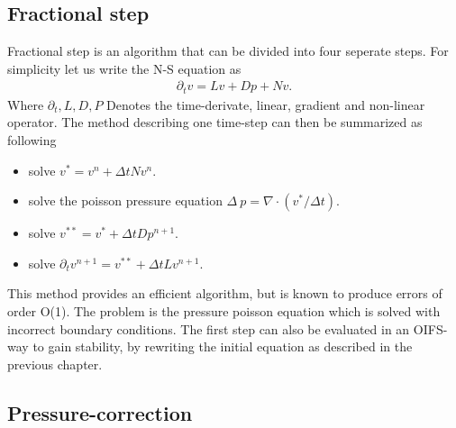 \subsection{Fractional step}
Fractional step is an algorithm that can be divided into four seperate steps. For simplicity let us write the N-S
equation as 
\begin{align}
    \partial_t v = Lv + Dp + Nv.
    \label{eq:NSfracstep}
\end{align}
Where $\partial_t, L,D,P$ Denotes the time-derivate, linear, gradient and non-linear operator. 
The method describing one time-step can then be summarized as following
\begin{itemize}
    \item solve $v^* = v^n + \Delta t Nv^n$.
    \item solve the poisson pressure equation $\Delta\: p = \nabla \cdot (v^*/\Delta t)$.
    \item solve $v^{**} =v^* + \Delta t Dp^{n+1}$.
    \item solve $\partial_t v^{n+1}=v^{**} + \Delta t Lv^{n+1}$.
\end{itemize}
This method provides an efficient algorithm, but is known to produce errors of order O(1).
The problem is the pressure poisson equation which is solved with incorrect boundary 
conditions. The first step can also be evaluated in an OIFS-way to gain stability, by rewriting the initial equation 
as described in the previous chapter. 

\subsection{Pressure-correction}



